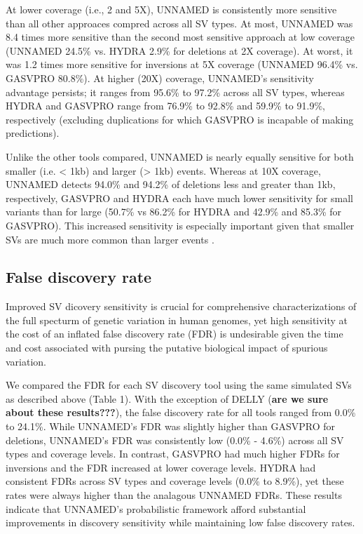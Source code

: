 \documentclass[11pt]{article}
\begin{document}
At lower coverage (i.e., 2 and 5X), UNNAMED is consistently more sensitive 
than all other approaces compred across all SV types. At most, UNNAMED was 
8.4 times more sensitive than the second most
sensitive approach at low coverage (UNNAMED 24.5\% vs. HYDRA 2.9\% for deletions
at 2X coverage). At worst, it was 1.2 times more sensitive for inversions at
5X coverage (UNNAMED 96.4\% vs. GASVPRO 80.8\%). At higher (20X) coverage, 
UNNAMED's sensitivity advantage persists; it ranges from 95.6\% to 97.2\% 
across all SV types, whereas HYDRA and GASVPRO range from 76.9\% to 92.8\% and
59.9\% to 91.9\%, respectively (excluding duplications for which GASVPRO is
incapable of making predictions).

Unlike the other tools compared, UNNAMED is nearly equally sensitive for 
both smaller (i.e. < 1kb) and larger (> 1kb) events. Whereas at 10X coverage,
UNNAMED detects 94.0\% and 94.2\% of deletions less and greater than 1kb, 
respectively, GASVPRO and HYDRA each have much lower sensitivity for small
variants than for large (50.7\% vs 86.2\% for HYDRA and 42.9\% and 85.3\% for
GASVPRO). This increased sensitivity is especially important given that smaller
SVs are much more common than larger events \cite{mills2011}.


\subsection{False discovery rate}
Improved SV dicovery sensitivity is crucial for comprehensive characterizations
of the full specturm of genetic variation in human genomes, yet high
sensitivity at the cost of an inflated false discovery rate (FDR) is
undesirable given the time and cost associated with pursing
the putative biological impact of spurious variation.

We compared the FDR for each SV discovery tool using the same simulated
SVs as described above (Table 1). With the exception of DELLY (\textbf{are we sure about
these results???}), the false discovery rate for all tools ranged from 0.0\%
to 24.1\%. While UNNAMED's FDR was slightly higher than GASVPRO for deletions,
UNNAMED's FDR was consistently low (0.0\% - 4.6\%) across all SV types and
coverage levels. In contrast, GASVPRO had much higher FDRs for inversions and
the FDR increased at lower coverage levels.  HYDRA had consistent FDRs across
SV types and coverage levels (0.0\% to 8.9\%), yet these rates were always 
higher than the analagous UNNAMED FDRs. These results indicate that UNNAMED's
probabilistic framework afford substantial improvements in discovery
sensitivity while maintaining low false discovery rates.
\end{document}
